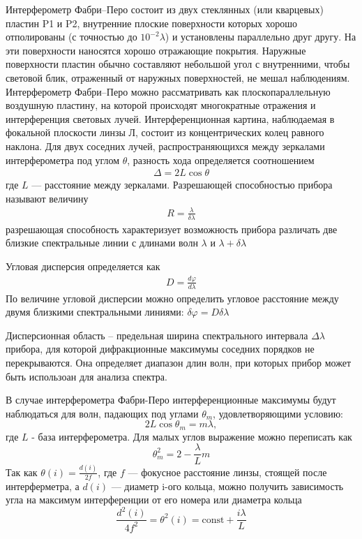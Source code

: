\documentclass[a4paper, 12pt]{article}
\begin{document}
Интерферометр Фабри–Перо состоит из двух стеклянных (или кварцевых) пластин P1 и P2,
внутренние плоские поверхности которых
хорошо отполированы (с точностью до $10^{-2}\lambda$) и установлены параллельно друг
другу. На эти поверхности наносятся хорошо отражающие покрытия. Наружные поверхности
пластин обычно составляют небольшой угол с внутренними, чтобы световой блик,
отраженный от наружных поверхностей, не мешал наблюдениям. Интерферометр Фабри–Перо можно
рассматривать как плоскопараллельную воздушную пластину, на которой происходят
многократные отражения и интерференция световых лучей. Интерференционная картина,
наблюдаемая в фокальной плоскости линзы Л, состоит из концентрических колец равного
наклона. Для двух соседних лучей, распространяющихся между зеркалами интерферометра
под углом $\theta$, разность хода определяется соотношением
\begin{align*}
\Delta = 2L\cos\theta
\end{align*}
где $L$ --- расстояние между зеркалами.
Разрешающей способностью прибора называют величину
\begin{align*}
R = \frac{\lambda}{\delta\lambda}
\end{align*}
разрешающая способность характеризует возможность прибора различать
две близкие спектральные линии с длинами волн $\lambda$ и $\lambda+\delta\lambda$

Угловая дисперсия определяется как
\begin{align*}
D = \frac{d\varphi}{d\lambda}
\end{align*} 
По величине угловой дисперсии можно определить угловое расстояние между двумя
близкими спектральными линиями: $\delta\varphi = D\delta\lambda$

Дисперсионная область – предельная ширина спектрального интервала $\Delta\lambda$ прибора, для которой дифракционные максимумы соседних порядков не перекрываются. Она определяет диапазон
длин волн, при которых прибор может быть использоан для анализа спектра.

В случае интерферометра Фабри-Перо интерференционные
максимумы будут наблюдаться для волн, падающих под углами $\theta_{m}$, удовлетворяющими
условию:
\begin{equation}\label{max_inter}
    2L\cos{\theta_{m}} = m\lambda,
\end{equation}
где $L$ - база интерферометра. Для малых углов выражение можно переписать как 
\begin{equation}
\label{eq:1}
\theta_m^2 = 2 - \frac{\lambda}{L}m
\end{equation}
Так как  $\theta(i) = \frac{d(i)}{2f}$, где $f$ --- фокусное расстояние линзы, стоящей после интерферметра, а $d(i)$ --- диаметр i-ого кольца, можно
получить зависимость угла на максимум интерференции от его номера или диаметра кольца 
\begin{equation}
\label{eq:2}
\frac{d^2(i)}{4f^2} = \theta^2(i) = \text{const} + \frac{i\lambda}{L}
\end{equation}
\end{document}
